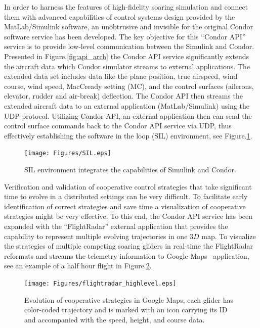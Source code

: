 \documentclass[letterpaper, 10 pt, conference]{ieeeconf}  %
\begin{document}
In order to harness the features of high-fidelity soaring simulation and connect them with advanced capabilities of control systems design provided by the MatLab/Simulink software, an unobtrusive and invisible for the original Condor software service has been developed. The key objective for this ``Condor API'' service is to provide low-level communication between the Simulink and Condor. Presented in Figure.\ref{fig:api_arch} the Condor API service significantly extends the aircraft data which Condor simulator streams to external applications. The extended data set includes data like the plane position, true airspeed, wind course, wind speed, MacCready setting (MC), and the control surfaces (ailerons, elevator, rudder and air-break) deflection. The Condor API then streams the extended aircraft data to an external application (MatLab/Simulink) using the UDP protocol. Utilizing Condor API, an external application then can send the control surface commands back to the Condor API service via UDP, thus effectively establishing the software in the loop (SIL) environment, see Figure.\ref{fig:SIL}.
\begin{figure}[thpb]
  \centering
  \texttt{[image: Figures/SIL.eps]}
  \caption{SIL environment integrates the capabilities of Simulink and Condor.}
  \label{fig:SIL}
\end{figure}

Verification and validation of cooperative control strategies that take significant time to evolve in a distributed settings can be very difficult. To facilitate early identification of correct strategies and save time a visualization of cooperative strategies might be very effective. To this end, the Condor API service has been expanded with the ``FlightRadar'' external application that provides the capability to represent multiple evolving trajectories in one $3D$ map. To visualize the strategies of multiple competing soaring gliders in real-time the FlightRadar reformats and streams the telemetry information to Google Maps~\cite{GoogleMaps:2013:Online} application, see an example of a half hour flight in Figure.\ref{fig:FlightRadar}.
\begin{figure}[thpb]
  \centering
  \texttt{[image: Figures/flightradar\_highlevel.eps]}
  \caption{Evolution of cooperative strategies in Google Maps; each glider has color-coded trajectory and is marked with an icon carrying its ID and accompanied with the speed, height, and course data.}
  \label{fig:FlightRadar}
\end{figure}
\end{document}
